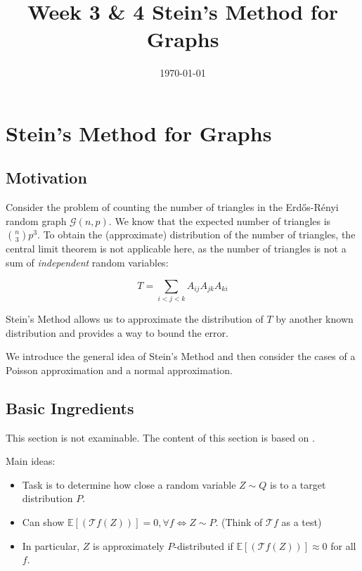 \documentclass{article}
\title{Week 3 \& 4 Stein's Method for Graphs}
\date{\today}
\begin{document}
\maketitle

\section{Stein's Method for Graphs}

\subsection{Motivation}
Consider the problem of counting the number of triangles in the Erd\H{o}s-R\'{e}nyi random graph $\mathcal{G}(n,p)$. We know that the expected number of triangles is $\binom{n}{3}p^3$. To obtain the (approximate) distribution of the number of triangles, the central limit theorem is not applicable here, as the number of triangles is not a sum of \textit{independent} random variables:  

\begin{equation*}
    T=\sum_{i<j<k} A_{ij}A_{jk}A_{ki}
\end{equation*}

Stein's Method allows us to approximate the distribution of $T$ by another known distribution and provides a way to bound the error.  

We introduce the general idea of Stein's Method and then consider the cases of a Poisson approximation and a normal approximation.

\subsection{Basic Ingredients}

\begin{unexaminable}
    This section is not examinable. The content of this section is based on \citep{anastasiou2022steins}.
\end{unexaminable}

Main ideas:   
\begin{itemize}
    \item Task is to determine how close a random variable $Z \sim Q$ is to a target distribution $P$.
    \item Can show $\mathbb{E}[(\mathcal{T}f (Z))]=0, \forall f \iff Z\sim P$. (Think of $\mathcal{T}f$ as a test) 
    \item  In particular, $Z$ is approximately $P$-distributed if $\mathbb{E}[(\mathcal{T}f (Z))]\approx 0$ for all $f$.  
\end{itemize}
\end{document}

